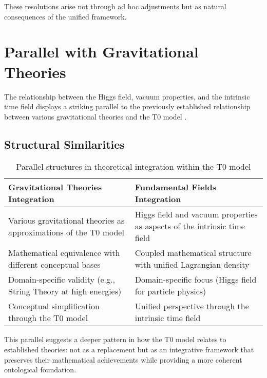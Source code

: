 \documentclass[12pt,a4paper]{article}
\begin{document}
	These resolutions arise not through ad hoc adjustments but as natural consequences of the unified framework.
	
	\section{Parallel with Gravitational Theories}
	\label{sec:parallel_gravitation}
	
	The relationship between the Higgs field, vacuum properties, and the intrinsic time field displays a striking parallel to the previously established relationship between various gravitational theories and the T0 model \cite{pascher_completetheory_2025}.
	
	\subsection{Structural Similarities}
	\label{subsec:structural_similarities}
	
	\begin{table}[h]
		\centering
		\begin{tabular}{|p{}|p{}|}
			\hline
			\textbf{Gravitational Theories Integration} & \textbf{Fundamental Fields Integration} \\
			\hline
			Various gravitational theories as approximations of the T0 model & Higgs field and vacuum properties as aspects of the intrinsic time field \\
			\hline
			Mathematical equivalence with different conceptual bases & Coupled mathematical structure with unified Lagrangian density \\
			\hline
			Domain-specific validity (e.g., String Theory at high energies) & Domain-specific focus (Higgs field for particle physics) \\
			\hline
			Conceptual simplification through the T0 model & Unified perspective through the intrinsic time field \\
			\hline
		\end{tabular}
		\caption{Parallel structures in theoretical integration within the T0 model}
		\label{tab:parallel_structures}
	\end{table}
	
	This parallel suggests a deeper pattern in how the T0 model relates to established theories: not as a replacement but as an integrative framework that preserves their mathematical achievements while providing a more coherent ontological foundation.
	
\end{document}

